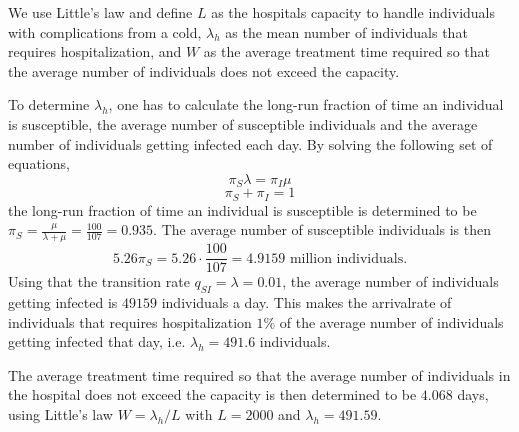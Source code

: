 We use Little's law and define $L$ as the hospitals capacity to handle individuals with complications from a cold, $\lambda_h$ as the mean number of individuals that requires hospitalization, and $W$ as the average treatment time required so that the average number of individuals does not exceed the capacity. 

To determine $\lambda_h$, one has to calculate the long-run fraction of time an individual is susceptible, the average number of susceptible individuals and the average number of individuals getting infected each day. By solving the following set of equations, 
$$ \pi_S \lambda = \pi_I \mu$$ 
$$ \pi_S + \pi_I = 1 $$
the long-run fraction of time an individual is susceptible is determined to be $\pi_S = \frac{\mu}{\lambda + \mu} = \frac{100}{107} = 0.935.$
The average number of susceptible individuals is then 
$$ 5.26  \pi_S = 5.26 \cdot \frac{100}{107} = 4.9159 \text{ million individuals.}$$
Using that the transition rate $ q_{SI} = \lambda = 0.01$, the average number of individuals getting infected is $49159$ individuals a day. This makes the arrivalrate of individuals that requires hospitalization $1\%$ of the average number of individuals getting infected that day, i.e. $\lambda_h = 491.6$ individuals. 

The average treatment time required so that the average number of individuals in the hospital does not exceed the capacity is then determined to be $4.068$ days, using Little's law $W = \lambda_h/L$ with $L = 2000$ and $\lambda_h = 491.59$. 



